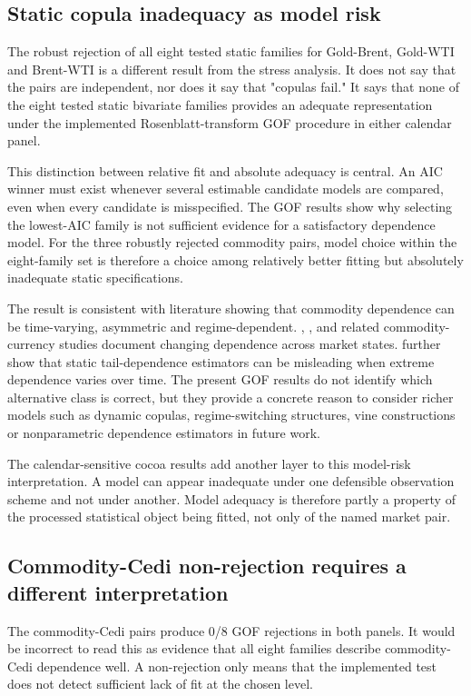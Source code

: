 \subsection{Static copula inadequacy as model risk}

The robust rejection of all eight tested static families for Gold-Brent, Gold-WTI and Brent-WTI is a different result from the stress analysis. It does not say that the pairs are independent, nor does it say that "copulas fail." It says that none of the eight tested static bivariate families provides an adequate representation under the implemented Rosenblatt-transform GOF procedure in either calendar panel.

This distinction between relative fit and absolute adequacy is central. An AIC winner must exist whenever several estimable candidate models are compared, even when every candidate is misspecified. The GOF results show why selecting the lowest-AIC family is not sufficient evidence for a satisfactory dependence model. For the three robustly rejected commodity pairs, model choice within the eight-family set is therefore a choice among relatively better fitting but absolutely inadequate static specifications.

The result is consistent with literature showing that commodity dependence can be time-varying, asymmetric and regime-dependent. \citet{ignatieva2017}, \citet{ning2025}, and related commodity-currency studies document changing dependence across market states. \citet{supper2020} further show that static tail-dependence estimators can be misleading when extreme dependence varies over time. The present GOF results do not identify which alternative class is correct, but they provide a concrete reason to consider richer models such as dynamic copulas, regime-switching structures, vine constructions or nonparametric dependence estimators in future work.

The calendar-sensitive cocoa results add another layer to this model-risk interpretation. A model can appear inadequate under one defensible observation scheme and not under another. Model adequacy is therefore partly a property of the processed statistical object being fitted, not only of the named market pair.

\subsection{Commodity-Cedi non-rejection requires a different interpretation}

The commodity-Cedi pairs produce 0/8 GOF rejections in both panels. It would be incorrect to read this as evidence that all eight families describe commodity-Cedi dependence well. A non-rejection only means that the implemented test does not detect sufficient lack of fit at the chosen level.

